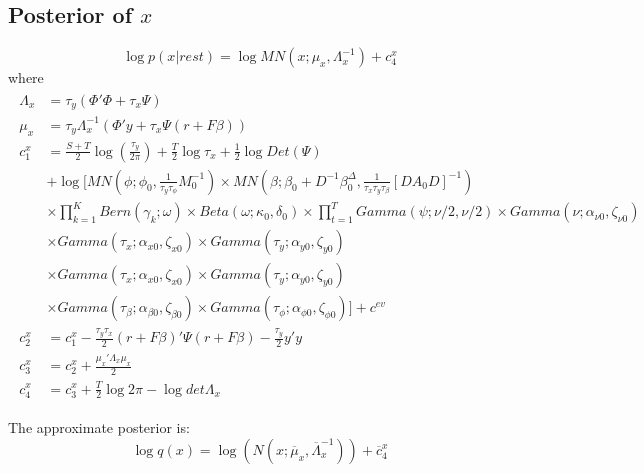 \documentclass[11pt]{article}
\begin{document}
\subsection{Posterior of $x$}
\begin{equation}
	\log p\left(x|rest\right) = \log MN\left(x;\mu_{x},\Lambda_{x}^{-1}\right)+c_{4}^{x}
\end{equation}
where
\begin{align*}
\begin{split}
	\Lambda_{x} 	&=	\tau_{y}\left(\Phi'\Phi+\tau_{x}\Psi\right)\\
	\mu_{x}		&=	\tau_{y}\Lambda_{x}^{-1}\left(\Phi'y+\tau_{x}\Psi\left(r+F\beta\right)\right)\\
	c_{1}^{x}		&=	\frac{S+T}{2}\log\left(\frac{\tau_{y}}{2\pi}\right)+\frac{T}{2}\log\tau_{x}+\frac{1}{2}\log Det\left(\Psi\right)\\
				&+\log\Bigg[MN\left(\phi;\phi_{0},\frac{1}{\tau_{y}\tau_{\phi}}M_{0}^{-1}\right)\times MN\left(\beta;\beta_{0}+D^{-1}\beta_{0}^{\Delta},\frac{1}{\tau_{x}\tau_{y}\tau_{\beta}}\left[DA_{0}D\right]^{-1}\right)\\
				&\times\prod_{k=1}^{K}Bern\left(\gamma_{k};\omega\right)\times Beta\left(\omega;\kappa_{0},\delta_{0}\right)\times\prod_{t=1}^{T}Gamma\left(\psi;\nu/2,\nu/2\right)\times Gamma\left(\nu;\alpha_{\nu0},\zeta_{\nu0}\right)\\
				&\times Gamma\left(\tau_{x};\alpha_{x0},\zeta_{x0}\right)\times Gamma\left(\tau_{y};\alpha_{y0},\zeta_{y0}\right)\\
				&\times Gamma\left(\tau_{x};\alpha_{x0},\zeta_{x0}\right)\times Gamma\left(\tau_{y};\alpha_{y0},\zeta_{y0}\right)\\
				&\times Gamma\left(\tau_{\beta};\alpha_{\beta0},\zeta_{\beta0}\right)\times Gamma\left(\tau_{\phi};\alpha_{\phi0},\zeta_{\phi0}\right)\Bigg]+c^{ev}\\
	c_{2}^{x}		&=	c_{1}^{x}-\frac{\tau_{y}\tau_{x}}{2}\left(r+F\beta\right)'\Psi\left(r+F\beta\right)-\frac{\tau_{y}}{2}y'y\\
	c_{3}^{x}		&=	c_{2}^{x}+\frac{\mu_{x}'\Lambda_{x}\mu_{x}}{2}\\
	c_{4}^{x}		&=	c_{3}^{x}+\frac{T}{2}\log2\pi-\log det\Lambda_{x}
\end{split}
\end{align*}

The approximate posterior is:
\begin{equation}
	\log q\left(x\right) = \log\left(N\left(x;\overline{\mu}_{x},\overline{\Lambda}_{x}^{-1}\right)\right)+\overline{c}_{4}^{x}
\end{equation}
\end{document}
